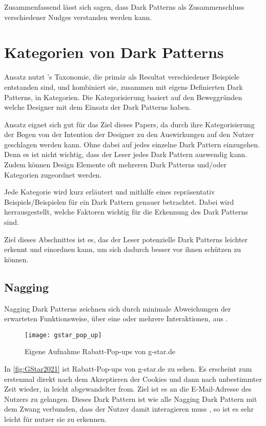 \documentclass[conference,compsoc,final,a4paper]{IEEEtran}
\begin{document}
Zusammenfassend lässt sich sagen, dass Dark Patterns als Zusammenschluss verschiedener Nudges verstanden werden kann.

\section{Kategorien von Dark Patterns}
\citeauthor*{Gray_2018} \autocite{Gray_2018} Ansatz nutzt \citeauthor{Brignull}'s \autocite{Brignull} Taxonomie, die primär als Resultat verschiedener Beispiele entstanden sind, und kombiniert sie, zusammen mit eigens Definierten Dark Patterns, in Kategorien. Die Kategorisierung basiert auf den Beweggründen welche Designer mit dem Einsatz der Dark Patterns haben.

\citeauthor*{Gray_2018} \autocite{Gray_2018} Ansatz eignet sich gut für das Ziel dieses Papers, da durch ihre Kategorisierung der Bogen von der Intention der Designer zu den Auswirkungen auf den Nutzer geschlagen werden kann. Ohne dabei auf jedes einzelne Dark Pattern einzugehen. Denn es ist nicht wichtig, dass der Leser jedes Dark Pattern auswendig kann. Zudem können Design Elemente oft mehreren Dark Patterns und/oder Kategorien zugeordnet werden.

Jede Kategorie wird kurz erläutert und mithilfe eines repräsentativ Beispiels/Beispielen für ein Dark Pattern genauer betrachtet. Dabei wird herrausgestellt, welche Faktoren wichtig für die Erkennung des Dark Patterns sind.

Ziel dieses Abschnittes ist es, das der Leser potenzielle Dark Patterns leichter erkennt und einordnen kann, um sich dadurch besser vor ihnen schützen zu können.
\subsection{Nagging}
Nagging Dark Patterns zeichnen sich durch minimale Abweichungen der erwarteten Funktionsweise, über eine oder mehrere Interaktionen, aus \autocite{Gray_2018}.

\begin{figure}[!ht]
  \centering
  \texttt{[image: gstar\_pop\_up]}
  \caption{Eigene Aufnahme Rabatt-Pop-ups von g-star.de~\autocite{GStar2021}}
  \label{fig:GStar2021}
\end{figure}

In \autoref{fig:GStar2021} ist Rabatt-Pop-ups von g-star.de zu sehen. Es erscheint zum erstenmal direkt nach dem Akzeptieren der Cookies und dann nach unbestimmter Zeit wieder, in leicht abgewandelter from. Ziel ist es an die E-Mail-Adresse des Nutzers zu gelangen. Dieses Dark Pattern ist wie alle Nagging Dark Pattern mit dem Zwang verbunden, dass der Nutzer damit interagieren muss \autocite{Gray_2018}, so ist es sehr leicht für nutzer sie zu erkennen.
\end{document}
